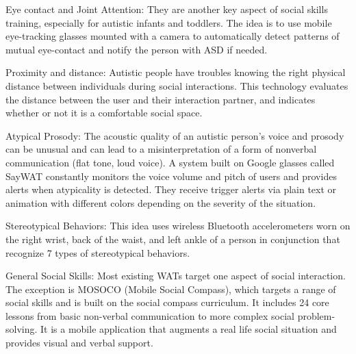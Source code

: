 Eye contact and Joint Attention: They are another key aspect of social skills training, especially for autistic infants and toddlers. The idea is to use mobile eye-tracking glasses mounted with a camera to automatically detect patterns of mutual eye-contact and notify the person with ASD if needed.

Proximity and distance: Autistic people have troubles knowing the right physical distance between individuals during social interactions. This technology evaluates the distance between the user and their interaction partner, and indicates whether or not it is a comfortable social space. 

Atypical Prosody: The acoustic quality of an autistic person’s voice and prosody can be unusual and can lead to a misinterpretation of a form of nonverbal communication (flat tone, loud voice). A system built on Google glasses called SayWAT constantly monitors the voice volume and pitch of users and provides alerts when atypicality is detected. They receive trigger alerts via plain text or animation with different colors depending on the severity of the situation.
 
Stereotypical Behaviors: This idea uses wireless Bluetooth accelerometers worn on the right wrist, back of the waist, and left ankle of a person in conjunction that recognize 7 types of stereotypical behaviors. 

General Social Skills: Most existing WATs target one aspect of social interaction. The exception is MOSOCO (Mobile Social Compass), which targets a range of social skills and is built on the social compass curriculum. It includes 24 core lessons from basic non-verbal communication to more complex social problem-solving. It is a mobile application that augments a real life social situation and provides visual and verbal support.
